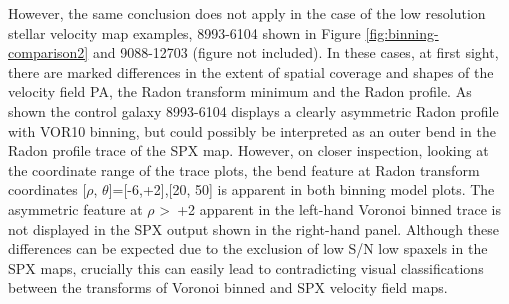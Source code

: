 However, the same conclusion does not apply in the case of the low resolution stellar velocity map examples, 8993-6104 shown in Figure \ref{fig:binning-comparison2} and 9088-12703 (figure not included). In these cases, at first sight, there are marked differences in the extent of spatial coverage and shapes of the velocity field PA, the Radon transform minimum and the Radon profile. As shown the control galaxy 8993-6104 displays a clearly asymmetric Radon profile with VOR10 binning, but could possibly be interpreted as an outer bend in the Radon profile trace of the SPX map. However, on closer inspection, looking at the coordinate range of the trace plots, the bend feature at Radon transform coordinates [$\rho$, $\theta$]=[-6,+2],[20, 50] is apparent in both binning model plots. The asymmetric feature at $\rho$ \textgreater\ +2 apparent in the left-hand Voronoi binned trace is not displayed in the SPX output shown in the right-hand panel. Although these differences can be expected due to the exclusion of low S/N low spaxels in the SPX maps, crucially this can easily lead to contradicting visual classifications between the transforms of Voronoi binned and SPX velocity field maps. 
